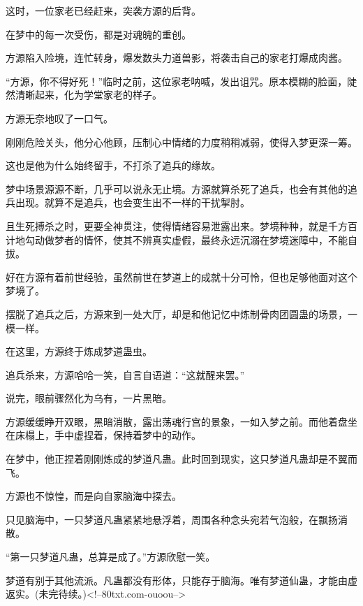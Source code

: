 \begin{this_body}
这时，一位家老已经赶来，突袭方源的后背。

在梦中的每一次受伤，都是对魂魄的重创。

方源陷入险境，连忙转身，爆发数头力道兽影，将袭击自己的家老打爆成肉酱。

“方源，你不得好死！”临时之前，这位家老呐喊，发出诅咒。原本模糊的脸面，陡然清晰起来，化为学堂家老的样子。

方源无奈地叹了一口气。

刚刚危险关头，他分心他顾，压制心中情绪的力度稍稍减弱，使得入梦更深一筹。

这也是他为什么始终留手，不打杀了追兵的缘故。

梦中场景源源不断，几乎可以说永无止境。方源就算杀死了追兵，也会有其他的追兵出现。就算不是追兵，也会变生出不一样的干扰掣肘。

且生死搏杀之时，更要全神贯注，使得情绪容易泄露出来。梦境种种，就是千方百计地勾动做梦者的情怀，使其不辨真实虚假，最终永远沉溺在梦境迷障中，不能自拔。

好在方源有着前世经验，虽然前世在梦道上的成就十分可怜，但也足够他面对这个梦境了。

摆脱了追兵之后，方源来到一处大厅，却是和他记忆中炼制骨肉团圆蛊的场景，一模一样。

在这里，方源终于炼成梦道蛊虫。

追兵杀来，方源哈哈一笑，自言自语道：“这就醒来罢。”

说完，眼前骤然化为乌有，一片黑暗。

方源缓缓睁开双眼，黑暗消散，露出荡魂行宫的景象，一如入梦之前。而他着盘坐在床榻上，手中虚捏着，保持着梦中的动作。

在梦中，他正捏着刚刚炼成的梦道凡蛊。此时回到现实，这只梦道凡蛊却是不翼而飞。

方源也不惊惶，而是向自家脑海中探去。

只见脑海中，一只梦道凡蛊紧紧地悬浮着，周围各种念头宛若气泡般，在飘扬消散。

“第一只梦道凡蛊，总算是成了。”方源欣慰一笑。

梦道有别于其他流派。凡蛊都没有形体，只能存于脑海。唯有梦道仙蛊，才能由虚返实。(未完待续。)<!--80txt.com-ouoou-->

\end{this_body}

